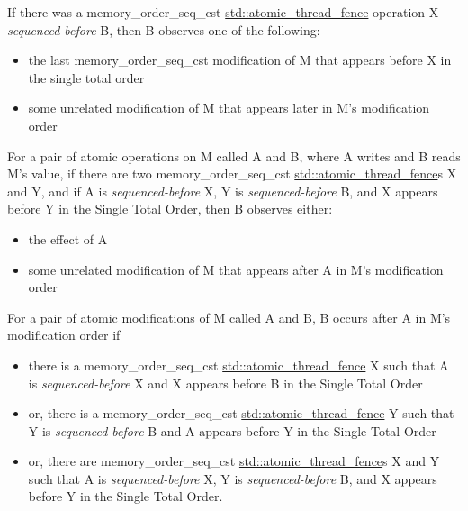 \documentclass[
]{article}
\begin{document}
If there was a memory\_order\_seq\_cst
\href{https://en.cppreference.com/w/cpp/atomic/atomic_thread_fence}{std::atomic\_thread\_fence}
operation X \emph{sequenced-before} B, then B observes one of the
following:

\begin{itemize}
\item
  the last memory\_order\_seq\_cst modification of M that appears before
  X in the single total order
\item
  some unrelated modification of M that appears later in M's
  modification order
\end{itemize}

For a pair of atomic operations on M called A and B, where A writes and
B reads M's value, if there are two memory\_order\_seq\_cst
\href{https://en.cppreference.com/w/cpp/atomic/atomic_thread_fence}{std::atomic\_thread\_fence}s
X and Y, and if A is \emph{sequenced-before} X, Y is
\emph{sequenced-before} B, and X appears before Y in the Single Total
Order, then B observes either:

\begin{itemize}
\item
  the effect of A
\item
  some unrelated modification of M that appears after A in M's
  modification order
\end{itemize}

For a pair of atomic modifications of M called A and B, B occurs after A
in M's modification order if

\begin{itemize}
\item
  there is a memory\_order\_seq\_cst
  \href{https://en.cppreference.com/w/cpp/atomic/atomic_thread_fence}{std::atomic\_thread\_fence}
  X such that A is \emph{sequenced-before} X and X appears before B in
  the Single Total Order
\item
  or, there is a memory\_order\_seq\_cst
  \href{https://en.cppreference.com/w/cpp/atomic/atomic_thread_fence}{std::atomic\_thread\_fence}
  Y such that Y is \emph{sequenced-before} B and A appears before Y in
  the Single Total Order
\item
  or, there are memory\_order\_seq\_cst
  \href{https://en.cppreference.com/w/cpp/atomic/atomic_thread_fence}{std::atomic\_thread\_fence}s
  X and Y such that A is \emph{sequenced-before} X, Y is
  \emph{sequenced-before} B, and X appears before Y in the Single Total
  Order.
\end{itemize}
\end{document}
